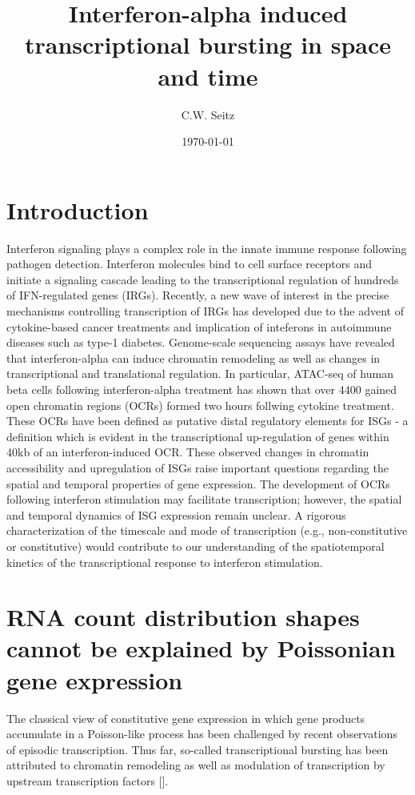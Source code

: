 \documentclass{article}
\title{Interferon-alpha induced transcriptional bursting in space and time}
\author{C.W. Seitz}
\date{\today}
\begin{document}
\maketitle

\section{Introduction}

Interferon signaling plays a complex role in the innate immune response following pathogen detection. Interferon molecules bind to cell surface receptors and initiate a signaling cascade leading to the transcriptional regulation of hundreds of IFN-regulated genes (IRGs). Recently, a new wave of interest in the precise mechanisms controlling transcription of IRGs has developed due to the advent of cytokine-based cancer treatments and implication of inteferons in autoimmune diseases such as type-1 diabetes. Genome-scale sequencing assays have revealed that interferon-alpha can induce chromatin remodeling as well as changes in transcriptional and translational regulation. In particular, ATAC-seq of human beta cells following interferon-alpha treatment has shown that over 4400 gained open chromatin regions (OCRs) formed two hours follwing cytokine treatment. These OCRs have been defined as putative distal regulatory elements for ISGs - a definition which is evident in the transcriptional up-regulation of genes within 40kb of an interferon-induced OCR. These observed changes in chromatin accessibility and upregulation of ISGs raise important questions regarding the spatial and temporal properties of gene expression. The development of OCRs following interferon stimulation may facilitate transcription; however, the spatial and temporal dynamics of ISG expression remain unclear. A rigorous characterization of the timescale and mode of transcription (e.g., non-constitutive or constitutive) would contribute to our understanding of the spatiotemporal kinetics of the transcriptional response to interferon stimulation.   


\section{RNA count distribution shapes cannot be explained by Poissonian gene expression}

The classical view of constitutive gene expression in which gene products accumulate in a Poisson-like process has been challenged by recent observations of episodic transcription. Thus far, so-called transcriptional bursting has been attributed to chromatin remodeling as well as modulation of transcription by upstream transcription factors []. 
\end{document}
